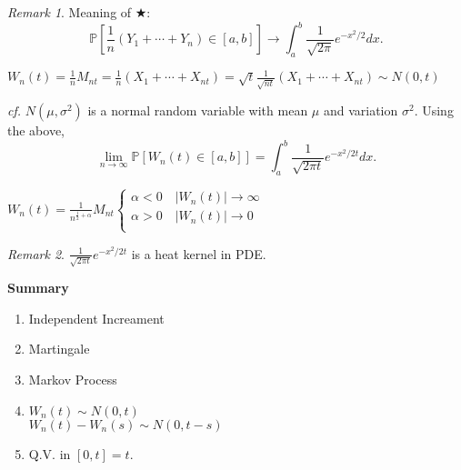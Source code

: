 \documentclass[12pt]{report}
\renewcommand{\P}{\mathbb{P}}
\renewcommand{\1}{\mathbb{1}}
\theoremstyle{break}
\theoremstyle{newdef}
\theoremstyle{remark}
\newtheorem*{rem}{Remark} %
\begin{document}
\begin{rem}
Meaning of $\bigstar$:
$$\P\left[\frac{1}{n} (Y_1 + \cdots + Y_n) \in [a,b]\right] \rightarrow \int_a^b \frac{1}{\sqrt{2\pi}} e^{-x^2/2}dx.$$
\end{rem}


$W_n(t) = \frac{1}{n} M_{nt} = \frac{1}{n} (X_1 + \cdots + X_{nt})
= \sqrt{t} \frac{1}{\sqrt{nt}} (X_1 + \cdots + X_{nt}) \sim N(0,t)$



\textit{cf.} $N(\mu, \sigma^2)$ is a normal random variable with mean $\mu$ and variation $\sigma^2$.
Using the above,
$$
\lim_{n\rightarrow\infty} \P\left[ W_n(t) \in [a,b]\right] = \int_a^b \frac{1}{\sqrt{2\pi t}} e^{-x^2/2t}dx.
$$

$
W_n(t) = \frac{1}{n^{\frac{1}{2} + \alpha}} M_{nt}
\begin{cases}
\alpha < 0 \quad |W_n(t)| \rightarrow \infty\\
\alpha > 0 \quad |W_n(t)| \rightarrow 0\\
\end{cases}
$


\begin{rem}
$\frac{1}{\sqrt{2\pi t}}e^{-x^2/2t}$ is a heat kernel in PDE.
\end{rem}

\vspace{5mm}

\textbf{Summary}
\begin{enumerate}
\item Independent Increament
\item Martingale
\item Markov Process
\item $W_n(t) \sim N(0,t)$\\
$W_n(t) - W_n(s) \sim N(0, t-s)$
\item Q.V. in $[0,t] = t$.
\end{enumerate}









\end{document}
